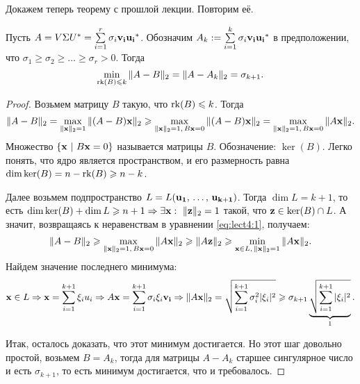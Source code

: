 Докажем теперь теорему с прошлой лекции. Повторим её.
\begin{theorem}
    \label{lect4:prev}
    Пусть $A=V\Sigma U^*=\sum\limits_{i=1}^r\sigma_i\mathbf{v_i}\mathbf{u_i}^*$. Обозначим
    $A_k:=\sum\limits_{i=1}^k\sigma_i\mathbf{v_i}\mathbf{u_i}^*$ в предположении, что
    $\sigma_1\geqslant \sigma_2\geqslant\ldots\geqslant \sigma_r>0$.
    Тогда \[
        \min_{\operatorname{rk}(B)\leqslant k} \|A-B\|_2=\|A-A_k\|_2=\sigma_{k+1}.
    \]

    \begin{proof}
        Возьмем матрицу $B$ такую, что $\operatorname{rk}(B)\leqslant k$. Тогда
        \begin{equation}
            \label{eq:lect4:1}
            \|A-B\|_2=\max_{\|\mathbf{x}\|_2=1}\|(A-B)\mathbf{x}\|_2\geqslant\max_{\|\mathbf{x}\|_2=1,\,B\mathbf{x}=0}\|(A-B)\mathbf{x}\|_2=
            \max_{\|\mathbf{x}\|_2=1,\,B\mathbf{x}=0}\|A\mathbf{x}\|_2.
        \end{equation}
        Множество $\{\vect{x}\ \vert\ B\vect{x}=0\}$ называется  матрицы $B$. Обозначение: $\ker(B)$. Легко понять, что
        ядро является пространством, и его размерность равна $\dim \ker (B)=n-\operatorname{rk}(B)\geqslant n-k$.

        Далее возьмем подпространство $L=L(\mathbf{u_1},\,\ldots,\, \mathbf{u_{k+1}})$. Тогда $\dim L = k + 1$, то есть
        $\dim \ker(B)+\dim L\geqslant n+1\Rightarrow\exists \mathbf{x}:\ \|\mathbf{z}\|_2=1$ такой, что $\mathbf{z}\in\ker(B)\cap L$.
        А значит, возвращаясь к неравенствам в уравнении \eqref{eq:lect4:1}, получаем:
        \[
            \|A-B\|_2\geqslant \max_{\|\mathbf{x}\|_2=1,\, B\mathbf{x}=0}\|A\mathbf{x}\|_2\geqslant \|A\mathbf{z}\|_2\geqslant
            \min_{\mathbf{x}\in L,\, \|\mathbf{x}\|_2=1}\|A\mathbf{x}\|_2.
        \]
        Найдем значение последнего минимума:
        \[
            \mathbf{x}\in L\Rightarrow \mathbf{x}=\sum_{i=1}^{k+1}\xi_iu_i\Rightarrow A\mathbf{x}=\sum_{i=1}^{k+1}\sigma_i\xi_i\mathbf{v_i}\Rightarrow
            \|A\mathbf{x}\|_2=\sqrt{\sum_{i=1}^{k+1}\sigma_i^2|\xi_i|^2}\geqslant \sigma_{k+1}\underbrace{\sqrt{\sum_{i=1}^{k+1}|\xi_i|^2}}_{1}.
        \]

        Итак, осталось доказать, что этот минимум достигается. Но этот шаг довольно простой, возьмем $B=A_k$, тогда для матрицы $A-A_k$
        старшее сингулярное число и есть $\sigma_{k+1}$, то есть минимум достигается, что и требовалось.

    \end{proof}
\end{theorem}

